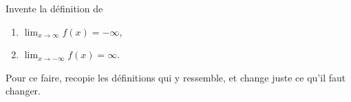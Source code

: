 

\begin{exercice}\label{exo203}
Invente la définition de
\begin{enumerate}
\item $\lim_{x\to\infty}f(x)=-\infty$,
\item $\lim_{x\to-\infty}f(x)=\infty$.
\end{enumerate}
Pour ce faire, recopie les définitions qui y ressemble, et change juste ce qu'il faut changer.
\end{exercice}
